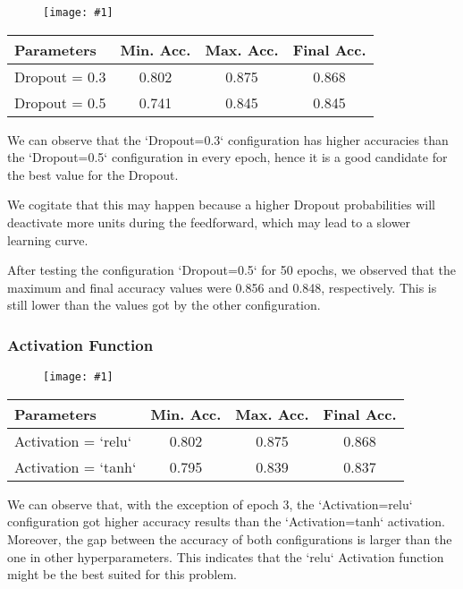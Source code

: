 \documentclass[10pt]{article}
\newcommand{\img}[1]{\begin{figure}[H]\centering\texttt{[image: \#1]}\end{figure}}
\begin{document}
\img{tuning/dropout.png}

\begin{center}
\begin{tabular}{||l|c|c|c||}
\hline
Parameters    & Min. Acc. & Max. Acc. & Final Acc. \\
\hline\hline
Dropout = 0.3 & 0.802     & 0.875     & 0.868      \\
\hline
Dropout = 0.5 & 0.741     & 0.845     & 0.845      \\
\hline
\end{tabular}
\end{center}
We can observe that the `Dropout=0.3` configuration has higher accuracies than the `Dropout=0.5` configuration in every epoch, hence it is a good candidate for the best value for the Dropout.

We cogitate that this may happen because a higher Dropout probabilities will deactivate more units during the feedforward, which may lead to a slower learning curve.

After testing the configuration `Dropout=0.5` for 50 epochs, we observed that the maximum and final accuracy values were 0.856 and 0.848, respectively.
This is still lower than the values got by the other configuration.


\subsubsection{Activation Function}

\img{tuning/activation_function.png}

\begin{center}
\begin{tabular}{||l|c|c|c||}
\hline
Parameters          & Min. Acc. & Max. Acc. & Final Acc. \\
\hline\hline
Activation = `relu` & 0.802     & 0.875     & 0.868      \\
\hline
Activation = `tanh` & 0.795     & 0.839     & 0.837      \\
\hline
\end{tabular}
\end{center}
We can observe that, with the exception of epoch 3, the `Activation=relu` configuration got higher accuracy results than the `Activation=tanh` activation.
Moreover, the gap between the accuracy of both configurations is larger than the one in other hyperparameters.
This indicates that the `relu` Activation function might be the best suited for this problem.
\end{document}
